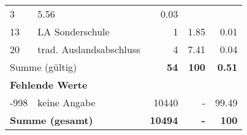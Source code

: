 \begin{longtable}{lXrrr}
       \num{3} &
       \num[round-mode=places,round-precision=2]{5.56} &
         \num[round-mode=places,round-precision=2]{0.03} \\

     13 &
     \multicolumn{1}{X}{ LA Sonderschule   } &


       \num{1} &
       \num[round-mode=places,round-precision=2]{1.85} &
         \num[round-mode=places,round-precision=2]{0.01} \\

     20 &
     \multicolumn{1}{X}{ trad. Auslandsabschluss   } &


       \num{4} &
       \num[round-mode=places,round-precision=2]{7.41} &
         \num[round-mode=places,round-precision=2]{0.04} \\
     \midrule
     \multicolumn{2}{l}{Summe (gültig)} &
       \textbf{\num{54}} &
     \textbf{\num{100}} &
       \textbf{\num[round-mode=places,round-precision=2]{0.51}} \\
     \multicolumn{5}{l}{\textbf{Fehlende Werte}}\\
       -998 &
       keine Angabe &
         \num{10440} &
        - &
         \num[round-mode=places,round-precision=2]{99.49} \\
     \midrule
     \multicolumn{2}{l}{\textbf{Summe (gesamt)}} &
          \textbf{\num{10494}} &
        \textbf{-} &
        \textbf{\num{100}} \\
     \bottomrule
     \end{longtable}
     
